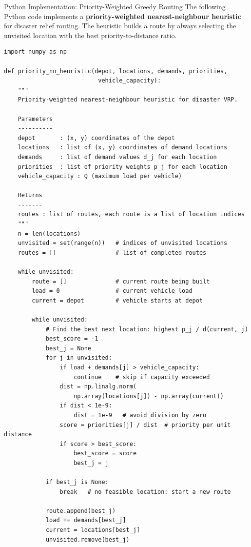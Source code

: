 \documentclass[aspectratio=169,10pt]{beamer}
\begin{document}
\begin{frame}[fragile]{Python Implementation: Priority-Weighted Greedy Routing}
  The following Python code implements a \textbf{priority-weighted
  nearest-neighbour heuristic} for disaster relief routing.
  The heuristic builds a route by always selecting the unvisited
  location with the best priority-to-distance ratio.

\begin{lstlisting}
import numpy as np

def priority_nn_heuristic(depot, locations, demands, priorities,
                           vehicle_capacity):
    """
    Priority-weighted nearest-neighbour heuristic for disaster VRP.

    Parameters
    ----------
    depot       : (x, y) coordinates of the depot
    locations   : list of (x, y) coordinates of demand locations
    demands     : list of demand values d_j for each location
    priorities  : list of priority weights p_j for each location
    vehicle_capacity : Q (maximum load per vehicle)

    Returns
    -------
    routes : list of routes, each route is a list of location indices
    """
    n = len(locations)
    unvisited = set(range(n))   # indices of unvisited locations
    routes = []                 # list of completed routes

    while unvisited:
        route = []              # current route being built
        load = 0                # current vehicle load
        current = depot         # vehicle starts at depot

        while unvisited:
            # Find the best next location: highest p_j / d(current, j)
            best_score = -1
            best_j = None
            for j in unvisited:
                if load + demands[j] > vehicle_capacity:
                    continue    # skip if capacity exceeded
                dist = np.linalg.norm(
                    np.array(locations[j]) - np.array(current))
                if dist < 1e-9:
                    dist = 1e-9   # avoid division by zero
                score = priorities[j] / dist  # priority per unit distance
                if score > best_score:
                    best_score = score
                    best_j = j

            if best_j is None:
                break   # no feasible location: start a new route

            route.append(best_j)
            load += demands[best_j]
            current = locations[best_j]
            unvisited.remove(best_j)


\end{lstlisting}
\end{frame}
\end{document}

